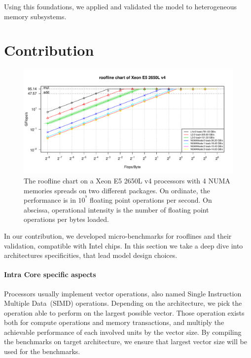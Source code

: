 \documentclass[twoside,twocolumn,8pt]{extarticle}
\begin{document}
Using this foundations, we applied and validated the model to heterogeneous memory subsystems.

\section{Contribution}\label{sec:contrib}
\begin{figure}
  \centering
  \includegraphics[width=\textwidth]{pictures/roofline_model}
  \caption{The roofline chart on a Xeon E5 2650L v4 processors with 4 NUMA memories spreads on two different packages. On ordinate, the performance is in $10^{^9}$ floating point operations per second. On abscissa, operational intensity is the number of floating point operations per bytes loaded.}
  \label{fig:orig_model}
\end{figure}

In our contribution, we developed micro-benchmarks for rooflines and their validation, compatible with Intel chips.
In this section we take a deep dive into architectures specificities, that lead model design choices.

\paragraph{Intra Core specific aspects}
Processors usually implement vector operations, also named Single Instruction Multiple Data~(SIMD) operations.
Depending on the architecture, we pick the operation able to perform on the largest possible vector. Those operation exists
both for compute operations and memory transactions, and multiply the achievable performance of each involved units by the vector
size. By compiling the benchmarks on target architecture, we ensure that largest vector size will be used for the benchmarks.
\end{document}
